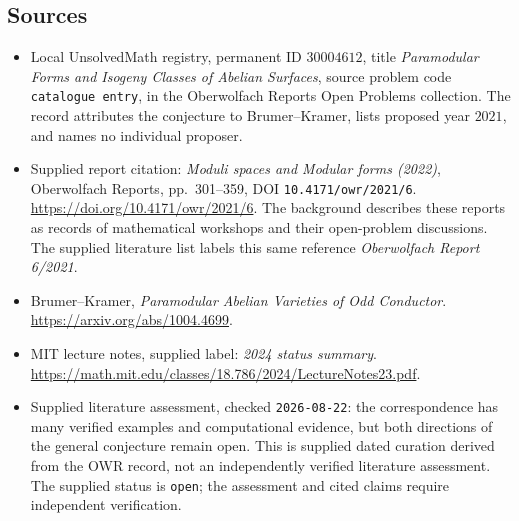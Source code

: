 \documentclass[11pt]{article}
\begin{document}
\subsection{Sources}
\begin{itemize}
\item Local UnsolvedMath registry, permanent ID \(30004612\), title \emph{Paramodular Forms and Isogeny Classes of Abelian Surfaces}, source problem code \texttt{catalogue entry}, in the Oberwolfach Reports Open Problems collection. The record attributes the conjecture to Brumer--Kramer, lists proposed year \(2021\), and names no individual proposer.
\item Supplied report citation: \emph{Moduli spaces and Modular forms (2022)}, Oberwolfach Reports, pp.~301--359, DOI \texttt{10.4171/owr/2021/6}. \url{https://doi.org/10.4171/owr/2021/6}. The background describes these reports as records of mathematical workshops and their open-problem discussions. The supplied literature list labels this same reference \emph{Oberwolfach Report 6/2021}.
\item Brumer--Kramer, \emph{Paramodular Abelian Varieties of Odd Conductor}. \url{https://arxiv.org/abs/1004.4699}.
\item MIT lecture notes, supplied label: \emph{2024 status summary}. \url{https://math.mit.edu/classes/18.786/2024/LectureNotes23.pdf}.
\item Supplied literature assessment, checked \texttt{2026-08-22}: the correspondence has many verified examples and computational evidence, but both directions of the general conjecture remain open. This is supplied dated curation derived from the OWR record, not an independently verified literature assessment. The supplied status is \texttt{open}; the assessment and cited claims require independent verification.
\end{itemize}
\end{document}
